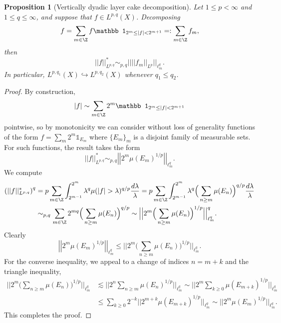 \documentclass[reqno]{amsart}
\newtheorem{proposition}[theorem]{Proposition}
\theoremstyle{definition}
\theoremstyle{remark}
\begin{document}
\begin{proposition}[Vertically dyadic
layer cake decomposition]
	Let $1 \leq p < \infty$ and $1 \leq q \leq \infty$, and suppose that $f \in L^{p, q} (X)$. Decomposing 
		\[ f = \sum_{m \in \Z} f \mathbb 1_{2^m \leq |f| < 2^{m + 1}} =: \sum_{m \in \Z} f_m, \]
	then 
		\[ ||f||^*_{L^{p, q}} \sim_{p, q} \Big|\Big| ||f_m||_{L^p} \Big|\Big|_{\ell^q_m} . \]
	In particular, $L^{p, q_1} (X) \hookrightarrow L^{p, q_2} (X)$ whenever $q_1 \leq q_2$. 		
\end{proposition}

\begin{proof}
	By construction, 
		\[ |f| \sim  \sum_{m \in \Z} 2^m \mathbb 1_{2^m \leq |f| < 2^{m + 1}}  \]
	pointwise, so by monotonicity we can consider without loss of generality functions of the form $f = \sum_m 2^m \mathbb 1_{E_m}$ where $\{E_m\}_m$ is a disjoint family of measurable sets. For such functions, the result takes the form 
		\[ ||f||^*_{L^{p, q}} \sim_{p, q} \left|\left| 2^m \mu(E_m)^{1/p} \right| \right|_{\ell^q_m}. \]	
	We compute
		\begin{align*}
			 \left( ||f||^*_{L^{p, q}} \right)^q 
			 	&= p \sum_{m \in \Z} \int_{2^{m -1}}^{2^{m}}  \lambda^q \mu (|f| > \lambda)^{q/p} \frac{d\lambda}{\lambda}  = p \sum_{m \in \Z} \int_{2^{m - 1}}^{2^m} \lambda^q \Big( \sum_{n \geq m} \mu(E_n)\Big)^{q/p} \frac{d\lambda}{\lambda} \\
			 	&\sim_{p, q} \sum_{m \in \Z} 2^{mq} \Big( \sum_{n \geq m} \mu(E_n) \Big)^{q/p} \sim \Big| \Big| 2^{m} \Big( \sum_{n \geq m} \mu(E_n) \Big)^{1/p}  \Big| \Big|_{\ell^q_m}^q.
		\end{align*}	
	Clearly
		\[ \left|\left| 2^m \mu(E_m)^{1/p} \right| \right|_{\ell^q_m} \leq \Big| \Big| 2^{m} \Big( \sum_{n \geq m} \mu(E_n) \Big)^{1/p}  \Big| \Big|_{\ell^q_m}.\]	
	For the converse inequality, we appeal to a change of indices $n = m + k$ and the triangle inequality,
		\begin{align*}
			 \Big| \Big| 2^{m} \Big( \sum_{n \geq m} \mu(E_n) \Big)^{1/p}  \Big| \Big|_{\ell^q_m} 
			 	&\lesssim \Big|\Big|2^n \sum_{n \geq m}  \mu(E_n)^{1/p} \Big|\Big|_{\ell^q_m}\sim \Big|\Big|2^{m} \sum_{k \geq 0}  \mu(E_{m + k})^{1/p} \Big|\Big|_{\ell^q_m} \\
			 	&\leq \sum_{k \geq 0} 2^{-k} \Big|\Big| 2^{m + k} \mu(E_{m + k})^{1/p} \Big|\Big|_{\ell^q_m} \sim ||2^m \mu(E_m)^{1/p}||_{\ell^q_m}.
		\end{align*}	 
	This completes the proof. 	
\end{proof}
\end{document}

